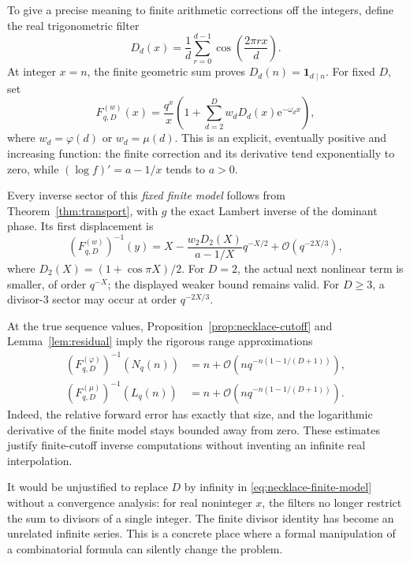 \documentclass[11pt,a4paper]{article}
\numberwithin{equation}{section}
\theoremstyle{definition}
\theoremstyle{remark}
\newcommand{\ee}{\mathrm e}
\newcommand{\bigO}{\mathcal O}
\begin{document}
To give a precise meaning to finite arithmetic corrections off the integers, define the real trigonometric filter
\begin{equation}
 D_d(x)=\frac1d\sum_{r=0}^{d-1}\cos\left(\frac{2\pi r x}{d}\right).
 \label{eq:divisibility-filter}
\end{equation}
At integer $x=n$, the finite geometric sum proves $D_d(n)=\mathbf1_{d\mid n}$. For fixed $D$, set
\begin{equation}
 F_{q,D}^{(w)}(x)=\frac{q^x}{x}
       \left(1+\sum_{d=2}^{D}w_dD_d(x)\ee^{-\omega_dx}\right),
 \label{eq:necklace-finite-model}
\end{equation}
where $w_d=\varphi(d)$ or $w_d=\mu(d)$. This is an explicit, eventually positive and increasing function: the finite correction and its derivative tend exponentially to zero, while $(\log f)'=a-1/x$ tends to $a>0$.

Every inverse sector of this \emph{fixed finite model} follows from Theorem~\ref{thm:transport}, with $g$ the exact Lambert inverse of the dominant phase. Its first displacement is
\begin{equation}
 (F_{q,D}^{(w)})^{-1}(y)
 =X-\frac{w_2D_2(X)}{a-1/X}q^{-X/2}
          +\bigO(q^{-2X/3}),
 \label{eq:necklace-finite-inverse}
\end{equation}
where $D_2(X)=(1+\cos\pi X)/2$. For $D=2$, the actual next nonlinear term is smaller, of order $q^{-X}$; the displayed weaker bound remains valid. For $D\ge3$, a divisor-$3$ sector may occur at order $q^{-2X/3}$.

At the true sequence values, Proposition~\ref{prop:necklace-cutoff} and Lemma~\ref{lem:residual} imply the rigorous range approximations
\begin{align}
 (F_{q,D}^{(\varphi)})^{-1}(N_q(n))
 &=n+\bigO\!\left(nq^{-n(1-1/(D+1))}\right),\nonumber\\
 (F_{q,D}^{(\mu)})^{-1}(L_q(n))
 &=n+\bigO\!\left(nq^{-n(1-1/(D+1))}\right).
 \label{eq:necklace-range}
\end{align}
Indeed, the relative forward error has exactly that size, and the logarithmic derivative of the finite model stays bounded away from zero. These estimates justify finite-cutoff inverse computations without inventing an infinite real interpolation.

It would be unjustified to replace $D$ by infinity in \eqref{eq:necklace-finite-model} without a convergence analysis: for real noninteger $x$, the filters no longer restrict the sum to divisors of a single integer. The finite divisor identity has become an unrelated infinite series. This is a concrete place where a formal manipulation of a combinatorial formula can silently change the problem.
\end{document}
